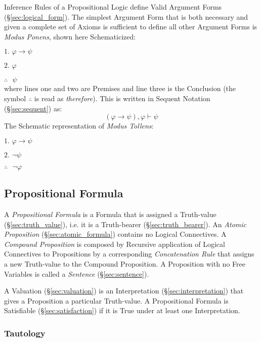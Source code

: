 Inference Rules of a Propositional Logic define Valid Argument Forms
(\S\ref{sec:logical_form}). The simplest Argument Form that is both necessary
and given a complete set of Axioms is sufficient to define all other Argument
Forms is \emph{Modus Ponens}, shown here Schematicized:

$\textrm{1. }\varphi \rightarrow \psi$

$\textrm{2. }\varphi$

$\therefore\textrm{ }\psi$ \\
where lines one and two are Premises and line three is the Conclusion
(the symbol $\therefore$ is read as \emph{therefore}). This is written
in Sequent Notation (\S\ref{sec:sequent}) as:
\[
  (\varphi \rightarrow \psi), \varphi \vdash \psi
\]
The Schematic representation of \emph{Modus Tollens}:

$\textrm{1. }\varphi \rightarrow \psi$

$\textrm{2. }\neg\psi$

$\therefore\textrm{ }\neg\varphi$\\



\subsection{Propositional Formula}\label{sec:propositional_formula}

A \emph{Propositional Formula} is a Formula that is assigned a Truth-value
(\S\ref{sec:truth_value}), i.e. it is a Truth-bearer (\S\ref{sec:truth_bearer}).
An \emph{Atomic Proposition} (\S\ref{sec:atomic_formula}) contains no Logical
Connectives. A \emph{Compound Proposition} is composed by Recursive application
of Logical Connectives to Propositions by a corresponding \emph{Concatenation
  Rule} that assigns a new Truth-value to the Compound Proposition. A
Proposition with no Free Variables is called a \emph{Sentence}
(\S\ref{sec:sentence}).

A Valuation (\S\ref{sec:valuation}) is an Interpretation
(\S\ref{sec:interpretation}) that gives a Proposition a particular Truth-value.
A Propositional Formula is Satisfiable (\S\ref{sec:satisfaction}) if it is True
under at least one Interpretation.



\subsubsection{Tautology}\label{sec:tautology}

